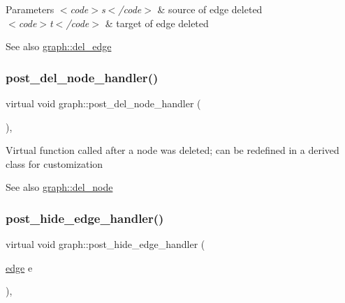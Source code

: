 \begin{DoxyParams}{Parameters}
{\em $<$code$>$s$<$/code$>$} & source of edge deleted \\
\hline
{\em $<$code$>$t$<$/code$>$} & target of edge deleted \\
\hline
\end{DoxyParams}
\begin{DoxySeeAlso}{See also}
\mbox{\hyperlink{classgraph_ad9356508c49c542dfd4b7169297387c6}{graph\+::del\+\_\+edge}} 
\end{DoxySeeAlso}
\mbox{\label{classgraph_a4e08a559e3f1007a1a16a53c9a15cb0f}} 
\subsubsection{\texorpdfstring{post\+\_\+del\+\_\+node\+\_\+handler()}{post\_del\_node\_handler()}}
{\footnotesize\ttfamily virtual void graph\+::post\+\_\+del\+\_\+node\+\_\+handler (\begin{DoxyParamCaption}{ }\end{DoxyParamCaption})\hspace{0.3cm}{\ttfamily [inline]}, {\ttfamily [virtual]}}

Virtual function called after a node was deleted; can be redefined in a derived class for customization

\begin{DoxySeeAlso}{See also}
\mbox{\hyperlink{classgraph_a8bdc09d5b9ac4bd26586b054d8fcbe91}{graph\+::del\+\_\+node}} 
\end{DoxySeeAlso}
\mbox{\label{classgraph_a7554deb5a22be446b2b423f2ce481c64}} 
\subsubsection{\texorpdfstring{post\+\_\+hide\+\_\+edge\+\_\+handler()}{post\_hide\_edge\_handler()}}
{\footnotesize\ttfamily virtual void graph\+::post\+\_\+hide\+\_\+edge\+\_\+handler (\begin{DoxyParamCaption}\item[{\mbox{\hyperlink{classedge}{edge}}}]{e }\end{DoxyParamCaption})\hspace{0.3cm}{\ttfamily [inline]}, {\ttfamily [virtual]}}

